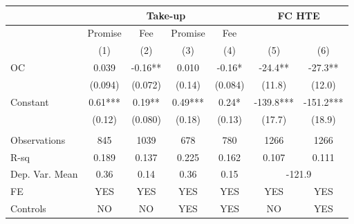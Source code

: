 \begin{tabular}{lcccccc}
\toprule
      & \multicolumn{4}{c}{Take-up}   & \multicolumn{2}{c}{FC HTE} \\
\midrule
\midrule
      & Promise & Fee   & Promise & Fee   &       &  \\
\midrule
      & (1)   & (2)   & (3)   & (4)   & (5)   & (6) \\
\midrule
\midrule
OC    & 0.039 & -0.16** & 0.010 & -0.16* & -24.4** & -27.3** \\
      & (0.094) & (0.072) & (0.14) & (0.084) & (11.8) & (12.0) \\
Constant  & 0.61*** & 0.19** & 0.49*** & 0.24* & -139.8*** & -151.2*** \\
      & (0.12) & (0.080) & (0.18) & (0.13) & (17.7) & (18.9) \\
      &       &       &       &       &       &  \\
\midrule
Observations & 845   & 1039  & 678   & 780   & 1266  & 1266 \\
R-sq  & 0.189 & 0.137 & 0.225 & 0.162 & 0.107 & 0.111 \\
Dep. Var. Mean & 0.36  & 0.14  & 0.36  & 0.15  & \multicolumn{2}{c}{-121.9} \\
FE    & YES   & YES   & YES   & YES   & YES   & YES \\
Controls & NO    & NO    & YES   & YES   & NO    & YES \\
\bottomrule
\bottomrule
\end{tabular}%
